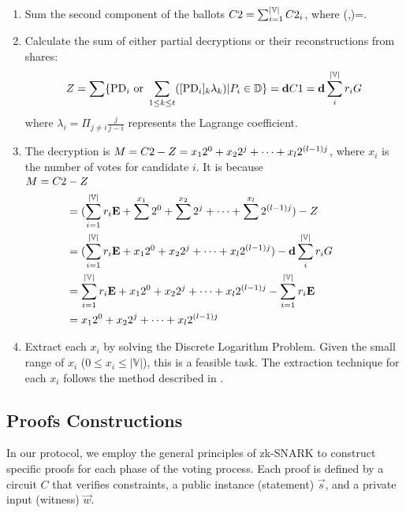 \documentclass[runningheads]{llncs}
\begin{document}
\begin{enumerate}
    \item Sum the second component of the ballots $C2 = \sum_{i=1}^{|\mathbb{V}|} C2_{i}$, where (,)=.
    
    \item Calculate the sum of either partial decryptions or their reconstructions from shares: \[Z = \sum\{\mathrm{PD}_{i} \textrm{ or } \sum_{1 \leq k \leq t}([\mathrm{PD}_{i}]_{k} \lambda_{k}) | P_{i} \in \mathbb{D}\} = \textbf{d}{} C1 = \mathbf{d} \sum_i^{|\mathbb{V}|} r_i G \] where $\lambda_{i}=\Pi_{j \neq i}\frac{j}{j-i}$ represents the Lagrange coefficient.

    \item The decryption is $M=C2{} - Z=x_1 2^0 + x_2 2^j + \dots + x_l 2^{(l-1)j}$, where $x_i$ is the number of votes for candidate $i$. It is because 
    $\begin{aligned} M=C2&-Z \\
        &= (\sum_{i=1}^{|\mathbb{V}|} r_{i} \mathbf{E} + \sum^{x_1} 2^0 + \sum^{x_2} 2^j + \dots + \sum^{x_l} 2^{(l-1)j}) - Z\\
        &= (\sum_{i=1}^{|\mathbb{V}|} r_{i} \mathbf{E} + x_1 2^0 + x_2 2^j + \dots + x_l 2^{(l-1)j}) - \mathbf{d} \sum_i^{|\mathbb{V}|{}} r_i G \\
        &= \sum_{i=1}^{|\mathbb{V}|} r_{i} \mathbf{E} + x_1 2^0 + x_2 2^j + \dots + x_l 2^{(l-1)j} - \sum_{i=1}^{|\mathbb{V}|} r_{i} \mathbf{E}\\
        &= x_1 2^0 + x_2 2^j + \dots + x_l 2^{(l-1)j}\\
        \end{aligned}$
    
    \item Extract each $x_i$ by solving the Discrete Logarithm Problem. Given the small range of $x_i$ ($0 \leq x_i \leq |\mathbb{V}|$), this is a feasible task. The extraction technique for each $x_i$ follows the method described in \cite{haoAnonymousVotingTworound2010}.
\end{enumerate}





\subsection{Proofs Constructions}\label{sec:proofs}

In our protocol, we employ the general principles of zk-SNARK to construct specific proofs for each phase of the voting process. Each proof is defined by a circuit $C$ that verifies constraints, a public instance (statement) $\vec{s}$, and a private input (witness) $\vec{w}$.
\end{document}
